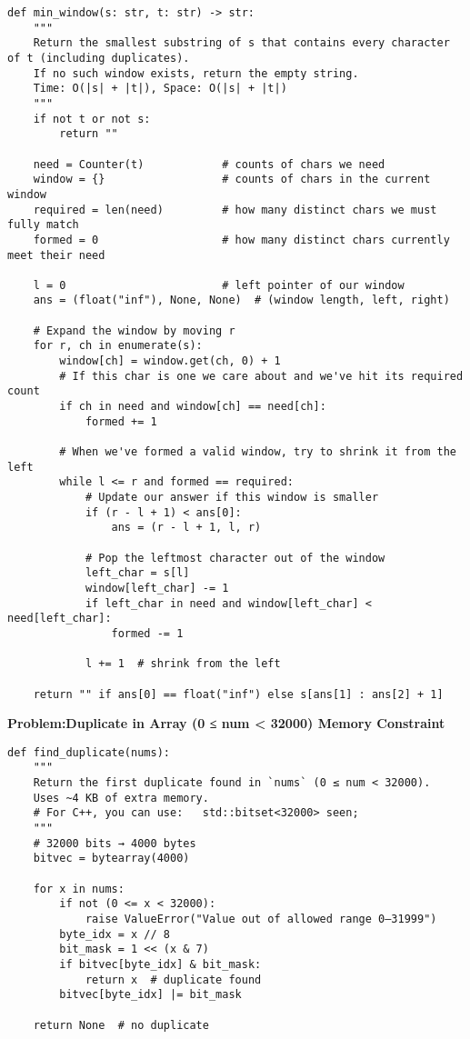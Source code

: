 \begin{verbatim}
def min_window(s: str, t: str) -> str:
    """
    Return the smallest substring of s that contains every character of t (including duplicates).
    If no such window exists, return the empty string.
    Time: O(|s| + |t|), Space: O(|s| + |t|)
    """
    if not t or not s:
        return ""

    need = Counter(t)            # counts of chars we need
    window = {}                  # counts of chars in the current window
    required = len(need)         # how many distinct chars we must fully match
    formed = 0                   # how many distinct chars currently meet their need

    l = 0                        # left pointer of our window
    ans = (float("inf"), None, None)  # (window length, left, right)

    # Expand the window by moving r
    for r, ch in enumerate(s):
        window[ch] = window.get(ch, 0) + 1
        # If this char is one we care about and we've hit its required count
        if ch in need and window[ch] == need[ch]:
            formed += 1

        # When we've formed a valid window, try to shrink it from the left
        while l <= r and formed == required:
            # Update our answer if this window is smaller
            if (r - l + 1) < ans[0]:
                ans = (r - l + 1, l, r)

            # Pop the leftmost character out of the window
            left_char = s[l]
            window[left_char] -= 1
            if left_char in need and window[left_char] < need[left_char]:
                formed -= 1

            l += 1  # shrink from the left

    return "" if ans[0] == float("inf") else s[ans[1] : ans[2] + 1]

\end{verbatim}

\noindent\textbf{Problem:Duplicate in Array (0 ≤ num < 32000) Memory Constraint}
\begin{verbatim}
def find_duplicate(nums):
    """
    Return the first duplicate found in `nums` (0 ≤ num < 32000).
    Uses ~4 KB of extra memory.
    # For C++, you can use:   std::bitset<32000> seen;
    """
    # 32000 bits → 4000 bytes
    bitvec = bytearray(4000)

    for x in nums:
        if not (0 <= x < 32000):
            raise ValueError("Value out of allowed range 0–31999")
        byte_idx = x // 8
        bit_mask = 1 << (x & 7)
        if bitvec[byte_idx] & bit_mask:
            return x  # duplicate found
        bitvec[byte_idx] |= bit_mask

    return None  # no duplicate
\end{verbatim}

